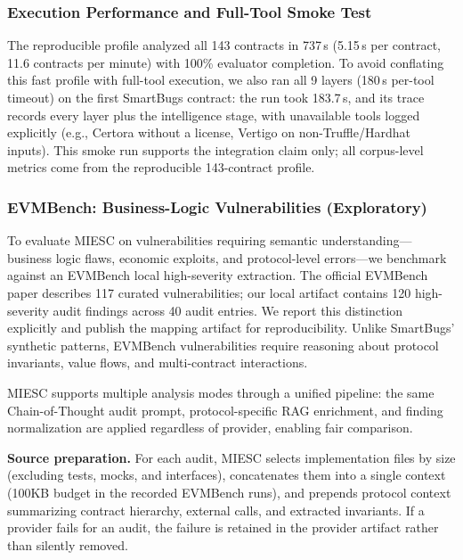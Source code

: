 \documentclass[conference]{IEEEtran}
\begin{document}
\subsubsection{Execution Performance and Full-Tool Smoke Test}
\label{sec:performance}

The reproducible profile analyzed all 143 contracts in 737\,s (5.15\,s per contract, 11.6 contracts per minute) with 100\% evaluator completion. To avoid conflating this fast profile with full-tool execution, we also ran all 9 layers (180\,s per-tool timeout) on the first SmartBugs contract: the run took 183.7\,s, and its trace records every layer plus the intelligence stage, with unavailable tools logged explicitly (e.g., Certora without a license, Vertigo on non-Truffle/Hardhat inputs). This smoke run supports the integration claim only; all corpus-level metrics come from the reproducible 143-contract profile.

\subsubsection{EVMBench: Business-Logic Vulnerabilities (Exploratory)}
\label{sec:evmbench}

To evaluate MIESC on vulnerabilities requiring semantic understanding---business logic flaws, economic exploits, and protocol-level errors---we benchmark against an EVMBench local high-severity extraction. The official EVMBench paper describes 117 curated vulnerabilities; our local artifact contains 120 high-severity audit findings across 40 audit entries. We report this distinction explicitly and publish the mapping artifact for reproducibility. Unlike SmartBugs' synthetic patterns, EVMBench vulnerabilities require reasoning about protocol invariants, value flows, and multi-contract interactions.

MIESC supports multiple analysis modes through a unified pipeline: the same Chain-of-Thought audit prompt, protocol-specific RAG enrichment, and finding normalization are applied regardless of provider, enabling fair comparison.

\textbf{Source preparation.} For each audit, MIESC selects implementation files by size (excluding tests, mocks, and interfaces), concatenates them into a single context (100KB budget in the recorded EVMBench runs), and prepends protocol context summarizing contract hierarchy, external calls, and extracted invariants. If a provider fails for an audit, the failure is retained in the provider artifact rather than silently removed.
\end{document}
